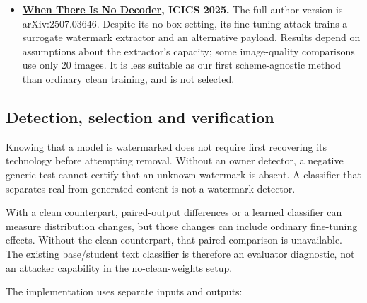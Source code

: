 \begin{itemize}
  context-dependent preferences, repeated-output diversity and cache
  effects. Their scope is those mechanisms and their modeling
  assumptions; they do not establish a detector for arbitrary unseen
  watermark technologies. Their instruction-following setup and
  family-specific assumptions need validation before applying them to
  instruct Qwen, TextSeal 2 or our learned latent adaptation.
\item
  \textbf{\href{https://doi.org/10.1007/978-981-95-3537-8_30}{When There
  Is No Decoder}, ICICS 2025.} The full author version is
  arXiv:2507.03646. Despite its no-box setting, its fine-tuning attack
  trains a surrogate watermark extractor and an alternative payload.
  Results depend on assumptions about the extractor's capacity; some
  image-quality comparisons use only 20 images. It is less suitable as
  our first scheme-agnostic method than ordinary clean training, and is
  not selected.
\end{itemize}

\subsection{Detection, selection and
verification}\label{record-docs-watermark-removal-literature-md-detection-selection-and-verification}

Knowing that a model is watermarked does not require first recovering
its technology before attempting removal. Without an owner detector, a
negative generic test cannot certify that an unknown watermark is
absent. A classifier that separates real from generated content is not a
watermark detector.

With a clean counterpart, paired-output differences or a learned
classifier can measure distribution changes, but those changes can
include ordinary fine-tuning effects. Without the clean counterpart,
that paired comparison is unavailable. The existing base/student text
classifier is therefore an evaluator diagnostic, not an attacker
capability in the no-clean-weights setup.

The implementation uses separate inputs and outputs:

